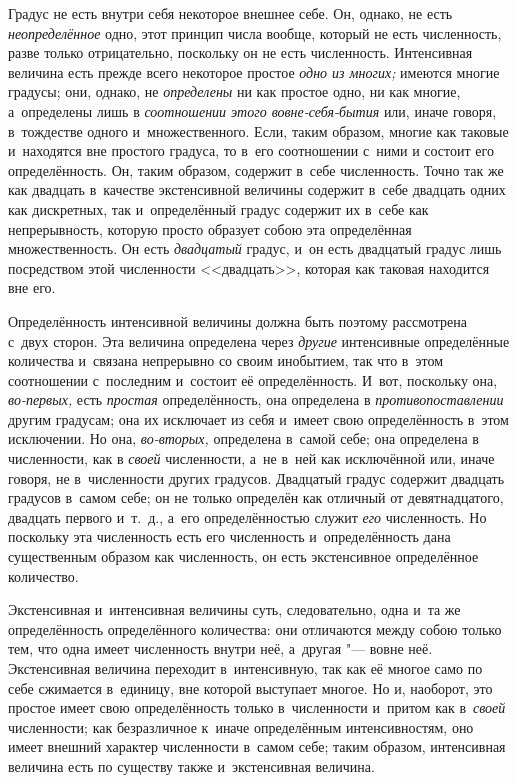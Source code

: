 
Градус не есть внутри себя некоторое внешнее себе. Он, однако, не есть
{\em неопределённое} одно, этот принцип числа вообще, который не есть
численность, разве только отрицательно, поскольку он не есть численность.
Интенсивная величина есть прежде всего некоторое простое {\em одно из многих;}
имеются многие градусы; они, однако, не {\em определены} ни как простое одно,
ни как многие, а~определены лишь в {\em соотношении этого вовне-себя-бытия} или,
иначе говоря, в~тождестве одного и~множественного. Если, таким образом, многие
как таковые и~находятся вне простого градуса, то в~его соотношении с~ними и
состоит его определённость. Он, таким образом, содержит в~себе численность.
Точно так же как двадцать в~качестве экстенсивной величины содержит в~себе
двадцать одних как дискретных, так и~определённый градус содержит их в~себе как
непрерывность, которую просто образует собою эта определённая множественность.
Он есть {\em двадцатый} градус, и~он есть двадцатый градус лишь посредством
этой численности <<двадцать>>, которая как таковая находится вне его.

Определённость интенсивной величины должна быть поэтому рассмотрена с~двух
сторон. Эта величина определена через {\em другие} интенсивные определённые
количества и~связана непрерывно со своим инобытием, так что в~этом соотношении
с~последним и~состоит её определённость. И~вот, поскольку она, {\em во-первых,}
есть {\em простая} определённость, она определена в {\em противопоставлении}
другим градусам; она их исключает из себя и~имеет свою определённость в~этом
исключении. Но она, {\em во-вторых,} определена в~самой себе; она определена в
численности, как в {\em своей} численности, а~не в~ней как исключённой или,
иначе говоря, не в~численности других градусов. Двадцатый градус содержит
двадцать градусов в~самом себе; он не только определён как отличный от
девятнадцатого, двадцать первого и~т.~д., а~его определённостью служит
{\em его} численность. Но поскольку эта численность есть его численность
и~определённость дана существенным образом как численность, он есть
экстенсивное определённое количество.

Экстенсивная и~интенсивная величины суть, следовательно, одна и~та же
определённость определённого количества: они отличаются между собою только тем,
что одна имеет численность внутри неё, а~другая "--- вовне неё.
Экстенсивная величина переходит в~интенсивную, так как её многое само по себе
сжимается в~единицу, вне которой выступает многое. Но и, наоборот, это простое
имеет свою определённость только в~численности и~притом как в~{\em своей}
численности; как безразличное к~иначе определённым интенсивностям, оно имеет
внешний характер численности в~самом себе; таким образом, интенсивная величина
есть по существу также и~экстенсивная величина.

